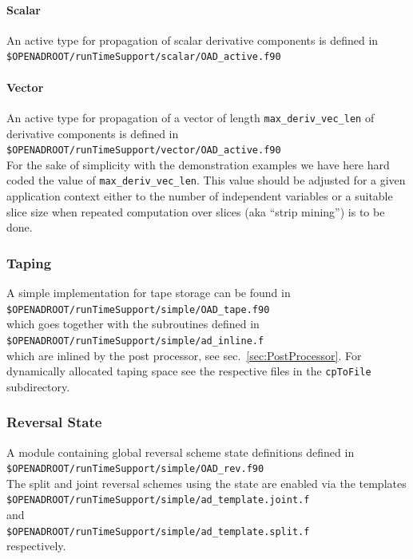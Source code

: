 \documentclass{book}
\newcommand{\refsec}[1]{{sec.~\ref{#1}}}
\begin{document}
\paragraph{Scalar}
An active type for propagation of scalar derivative components is defined in \\[1ex]
\hspace*{.3cm}\lstinline{$OPENADROOT/runTimeSupport/scalar/OAD_active.f90} %

\paragraph{Vector}
An active type for propagation of a vector of length 
\lstinline{max_deriv_vec_len} of derivative components is defined in \\[1ex]
\hspace*{.3cm}\lstinline{$OPENADROOT/runTimeSupport/vector/OAD_active.f90}\\[1ex] %
For the sake of simplicity with the demonstration examples 
we have here hard coded the value of \lstinline{max_deriv_vec_len}.  
This value should be adjusted for a given application context either to the number of independent 
variables or a suitable slice size when repeated computation over slices (aka ``strip mining'') 
is to be done.

\subsubsection{Taping}
A simple implementation for  tape storage can be found in \\[1ex]
\hspace*{.3cm}\lstinline{$OPENADROOT/runTimeSupport/simple/OAD_tape.f90}\\[1ex] %
which goes together with the subroutines defined in \\[1ex]
\hspace*{.3cm}\lstinline{$OPENADROOT/runTimeSupport/simple/ad_inline.f}\\[1ex] %
which are inlined by the post processor, see \refsec{sec:PostProcessor}.
For dynamically allocated taping space see the respective files in the \lstinline{cpToFile}
subdirectory.

\subsubsection{Reversal State}
A module containing global reversal scheme state definitions defined in  \\[1ex]
\hspace*{.3cm}\lstinline{$OPENADROOT/runTimeSupport/simple/OAD_rev.f90}\\[1ex] %
The split and joint reversal schemes using the state are enabled via the templates \\[1ex]
\hspace*{.3cm}\lstinline{$OPENADROOT/runTimeSupport/simple/ad_template.joint.f}\\[1ex] %
and\\[1ex]
\hspace*{.3cm}\lstinline{$OPENADROOT/runTimeSupport/simple/ad_template.split.f}\\[1ex] %
respectively.
\end{document}
